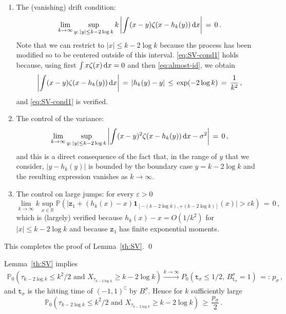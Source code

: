 \documentclass[reqno,11pt]{amsart}
\numberwithin{equation}{section}
\newcommand{\ind}{\mathbf{1}}
\newcommand{\dd}{\,\text{\rm d}}             %
\newcommand{\bbP}{{\ensuremath{\mathbb P}} }
\newcommand{\bbR}{{\ensuremath{\mathbb R}} }
\newcommand{\gep}{\varepsilon}       %
\newcommand{\gz}{\zeta}
\newcommand{\gs}{\sigma}
\newcommand{\logZ}{\mathtt{z}}
\begin{document}
\begin{enumerate}
\item The (vanishing) drift condition: 
\begin{equation}
\label{eq:SV-cond1}
\lim_{k \to \infty } \sup_{y:\, \vert y \vert \le k -2 \log k } k \left \vert \int (x-y) \gz (x-h_k(y)) \dd x \right \vert \, =\, 0\,.
\end{equation} 
Note that we can restrict to $\vert x \vert \le k -2 \log k$ because the process has been modified so  to be centered outside of this interval.  \eqref{eq:SV-cond1} holds because, using first  $\int  x\gz  (x) \dd x=0$  and then
\eqref{eq:almost-id}, we obtain
\begin{equation}
\label{eq:SVintstep}
\left \vert \int (x-y) \gz (x-h_k(y)) \dd x\right \vert \, =\,\left \vert h_k(y)-y\right\vert \,\le\, \exp(-2 \log k)\, =\, \frac 1{k^2}\, , 
\end{equation} 
and \eqref{eq:SV-cond1} is verified.
\item The control of the variance:  
\begin{equation}
\lim_{k \to \infty } \sup_{y:\, \vert y \vert \le k -2 \log k }\left \vert \int (x-y)^2 \gz (x-h_k(y)) \dd x - \gs^2 \right \vert \, =\, 0\, , 
\end{equation}
and this is a direct consequence of the fact that, in the range of $y$ that we consider,  $\vert y-h_k(y)\vert $
is bounded by the boundary case $y= k -2 \log k$ and the resulting expression vanishes as $k \to \infty$.  
\item The control on large jumps: for every $\gep>0$
\begin{equation}
\lim_{k \to \infty } 
k \sup_{x\in \bbR} \bbP\left(\vert \logZ_1+ \left(h_k(x)-x\right) \ind_{[ -(k -2 \log k),+(k -2 \log k)]}(x) \vert > \gep k\right) \, =\, 0\, ,
\end{equation}
which is (largely) verified because $h_k(x)-x= O(1/k^2)$ for $\vert x \vert \le k-2 \log k$ and because $\logZ_1$ has finite exponential moments.
\end{enumerate}
\smallskip

This completes the proof of Lemma~\ref{th:SV}.
\qed

 

\medskip
 Lemma~\ref{th:SV} implies 
\begin{multline}
\bbP_0\left( \tau_{k- 2 \log k} \le  k^2 /2 \textrm { and } X_{ \tau_{k- 2 \log k}} \ge  k- 2 \log k\right) 
\stackrel{k \to \infty} {\longrightarrow}
 P_0 \left( \mathtt t _\gs \le 1/{2}, \,  B^\gs_{\mathtt t _\gs} =1\right)\, =: \, p_\gs \, ,
\end{multline} 
  and $\mathtt t _\gs$ is the hitting time
of $(-1,1)^\complement$ by $B^\gs _\cdot$. Hence for $k$ sufficiently large 
\begin{equation}
\bbP_0\left( \tau_{k- 2 \log k} \le  k^2 /2 \textrm { and } X_{ \tau_{k- 2 \log k}} \ge  k- 2 \log k\right) 
\, \ge \, \frac{p_\gs}2\, .
\end{equation}
\end{document}
